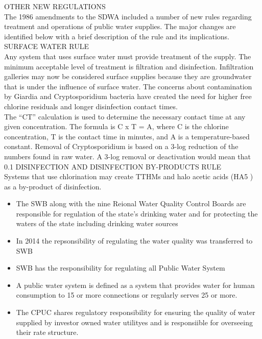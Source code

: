OTHER NEW REGULATIONS \\
The 1986 amendments to the SDWA included a number of new rules regarding treatment and operations of public water supplies. The major changes are identified below with a brief description of the rule and its implications. \\
SURFACE WATER RULE \\
Any system that uses surface water must provide treatment of the supply. The minimum acceptable level of treatment is filtration and disinfection. Infiltration galleries may now be considered surface supplies because they are groundwater that is under the influence of surface water. The concerns about contamination by Giardia and Cryptosporidium bacteria have created the need for higher free chlorine residuals and longer disinfection contact times. \\
The “CT” calculation is used to determine the necessary contact time at any given concentration. The formula is C x T = A, where C is the chlorine concentration, T is the contact time in minutes, and A is a temperature-based constant. Removal of Cryptosporidium is based on a 3-log reduction of the numbers found in raw water. A 3-log removal or deactivation would mean that 0.1%
DISINFECTION AND DISINFECTION BY-PRODUCTS RULE \\
Systems that use chlorination may create TTHMs and halo acetic acids (HA5 ) as a by-product of disinfection.   \\

\begin{itemize}
\item The SWB along with the nine Reional Water Quality Control Boards are responsible for regulation of the state's drinking water and for protecting the waters of the state including drinking water sources
\item In 2014 the repsonsibility of regulating the water quality was transferred to SWB
\item SWB has the responsibility for regulating all Public Water System
\item A public water system is defined as a system that provides water for human consumption to 15 or more connections or regularly serves 25 or more.\\

\item The CPUC shares regulatory responsibility for ensuring the quality of water supplied by investor owned water utilityes and is responsiible for overseeing their rate structure. 
\end{itemize}


